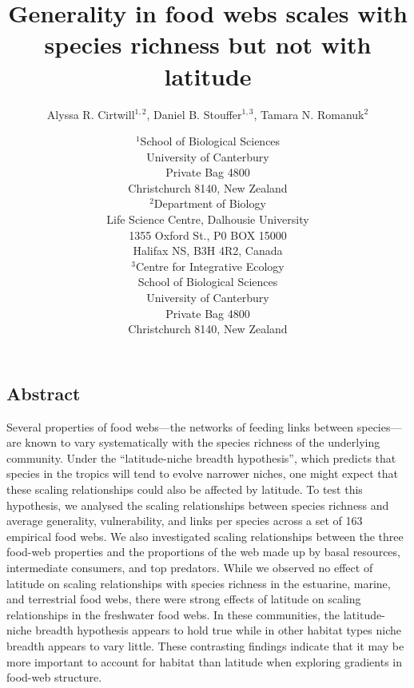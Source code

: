 \documentclass[12pt]{article}
\begin{document}
\title{Generality in food webs scales with species richness but not with latitude}
\author{Alyssa R. Cirtwill$^{1,2}$, Daniel B. Stouffer$^{1,3}$, Tamara N. Romanuk$^{2}$}
\date{\small$^1$School of Biological Sciences\\University of Canterbury\\
Private Bag 4800\\Christchurch 8140, New Zealand \\
\medskip$^2$Department of Biology\\
Life Science Centre, Dalhousie University\\1355 Oxford St., P0 BOX 15000\\
Halifax NS, B3H 4R2, Canada\\
\medskip$^3$Centre for Integrative Ecology\\School of Biological Sciences\\University of Canterbury\\
Private Bag 4800\\Christchurch 8140, New Zealand \\}

\maketitle
\baselineskip=8.5mm
 
\vspace{-0.3 in}

\begin{spacing}{1.0}
\section*{Abstract}

Several properties of food webs---the networks of feeding links between
species---are known to vary systematically with the species richness of the underlying
community.  Under the ``latitude-niche breadth hypothesis'', which predicts
that species in the tropics will tend to evolve narrower niches, one might
expect that these scaling relationships could also be affected by latitude. To
test this hypothesis, we analysed the scaling relationships between species
richness and average generality, vulnerability, and links per species across a
set of 163 empirical food webs.  We also investigated scaling relationships
between the three food-web properties and the proportions of the web made up
by basal resources, intermediate consumers, and top predators. While we
observed no effect of latitude on scaling relationships with species richness
in the estuarine, marine, and terrestrial food webs, there were strong effects
of latitude on scaling relationships in the freshwater food webs. In these
communities, the latitude-niche breadth hypothesis appears to hold true while
in other habitat types niche breadth appears to vary little. These contrasting
findings indicate that it may be more important to account for habitat than
latitude when exploring gradients in food-web structure.

\end{spacing}
\end{document}
